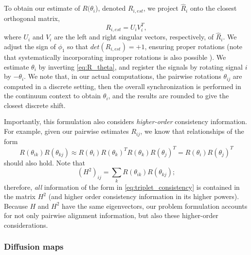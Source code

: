 \documentclass{pnastwo}
\begin{document}
\begin{article}
%
To obtain our estimate of $R(\theta_i$), denoted $R_{i, est}$, we project $\hat{R}_i$ onto the closest orthogonal matrix,
\begin{equation} \label{eq:R_est}
R_{i, est} = U_i V_i^T,
\end{equation}
where $U_i$ and $V_i$ are the left and right singular vectors, respectively, of $\hat{R}_i$.
%
We adjust the sign of $\phi_1$ so that $det(R_{i, est}) = +1$, ensuring proper rotations 
(note that systematically incorporating improper rotations is also possible \cite{goemans1995improved, bandeira2013cheeger}).
%
We estimate $\theta_{i}$ by inverting \eqref{eq:R_theta}, and register the signals by rotating signal $i$ by $-\theta_i$.
%
We note that, in our actual computations, the pairwise rotations $\theta_{ij}$ are computed in a discrete setting, then the overall
synchronization is performed in the continuum context to obtain $\theta_i$, and the results are rounded to give the closest
discrete shift.

Importantly, this formulation also considers {\it higher-order} consistency information.
%
For example, given our pairwise estimates $R_{ij}$, we know that relationships of the form
\begin{equation} \label{eq:triplet_consistency}
R(\theta_{ik}) R(\theta_{kj}) \approx R(\theta_i) R(\theta_k)^T R(\theta_k) R(\theta_j)^T = R(\theta_i) R(\theta_j)^T
\end{equation}
should also hold.
%
Note that
\begin{equation}
(H^2)_{ij} = \sum_k R(\theta_{ik}) R(\theta_{kj});
\end{equation}
therefore, {\it all} information of the form in \eqref{eq:triplet_consistency} is contained in the matrix $H^2$ (and higher order
consistency information in its higher powers).
%
Because $H$ and $H^2$ have the same eigenvectors, our problem formulation accounts for not only pairwise alignment information, but also these higher-order considerations.

\subsubsection{Diffusion maps \cite{coifman2005geometric}}


\end{article}
\end{document}
